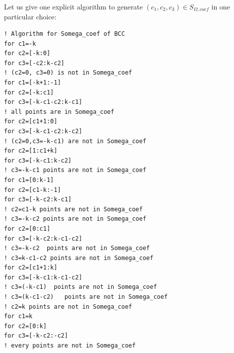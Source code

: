 \documentclass[10pt]{book}
\begin{document}
Let us give one explicit algorithm to generate $(c_1,c_2,c_3)\in S_{\Omega,coef}$
in one particular choice:
\begin{lstlisting}[frame=single]
! Algorithm for Somega_coef of BCC
for c1=-k
for c2=[-k:0]
for c3=[-c2:k-c2]
! (c2=0, c3=0) is not in Somega_coef
for c1=[-k+1:-1]
for c2=[-k:c1]
for c3=[-k-c1-c2:k-c1]
! all points are in Somega_coef
for c2=[c1+1:0]
for c3=[-k-c1-c2:k-c2]
! (c2=0,c3=-k-c1) are not in Somega_coef
for c2=[1:c1+k]     
for c3=[-k-c1:k-c2]
! c3=-k-c1 points are not in Somega_coef
for c1=[0:k-1]      
for c2=[c1-k:-1]
for c3=[-k-c2:k-c1]
! c2=c1-k points are not in Somega_coef
! c3=-k-c2 points are not in Somega_coef
for c2=[0:c1]
for c3=[-k-c2:k-c1-c2]
! c3=-k-c2  points are not in Somega_coef
! c3=k-c1-c2 points are not in Somega_coef  
for c2=[c1+1:k]
for c3=[-k-c1:k-c1-c2]
! c3=(-k-c1)  points are not in Somega_coef
! c3=(k-c1-c2)   points are not in Somega_coef
! c2=k points are not in Somega_coef
for c1=k     
for c2=[0:k]
for c3=[-k-c2:-c2]
! every points are not in Somega_coef
\end{lstlisting}
\end{document}
